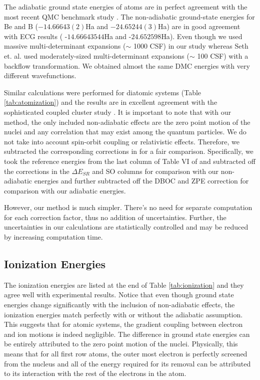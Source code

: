 \documentclass[aps,prl,superscriptaddress,groupedaddress]{revtex4}
\begin{document}
The adiabatic ground state energies of atoms are in perfect agreement with the most recent QMC benchmark study \cite{Seth_Bench}. The non-adiabatic ground-state energies for Be and B ($-14.66643(2)$Ha and $-24.65244(3)$Ha) are in good agreement with ECG results ( -$14.66643544$Ha \cite{Bubin_BeH_noBO} and -$24.652598$Ha\cite{Bubin_BH_noBO}). Even though we used massive multi-determinant expansions ($\sim$ 1000 CSF) in our study whereas Seth et. al. \cite{Seth_Bench} used moderately-sized multi-determinant expansions ($\sim$ 100 CSF) with a backflow transformation. We obtained almost the same DMC energies with very different wavefunctions.

Similar calculations were performed for diatomic systems (Table \ref{tab:atomization}) and the results are in excellent agreement with the sophisticated coupled cluster study \cite{Feller_Corrections}. It is important to note that with our method, the only included non-adiabatic effects are the zero point motion of the nuclei and any correlation that may exist among the quantum particles. We do not take into account spin-orbit coupling or relativistic effects. Therefore, we subtracted the corresponding corrections in \cite{Feller_Corrections} for a fair comparison. Specifically, we took the reference energies from the last column of Table VI of \cite{Feller_Corrections} and subtracted off the corrections in the $\Delta E_{SR}$ and SO columns for comparison with our non-adiabatic energies and further subtracted off the DBOC and ZPE correction for comparison with our adiabatic energies.

However, our method is much simpler. There's no need for separate computation for each correction factor, thus no addition of uncertainties. Further, the uncertainties in our calculations are statistically controlled and may be reduced by increasing computation time. 

\subsection{Ionization Energies}
The ionization energies are listed at the end of Table \ref{tab:ionization} and they agree well with experimental results. Notice that even though ground state energies change significantly with the inclusion of non-adiabatic effects, the ionization energies match perfectly with or without the adiabatic assumption. This suggests that for atomic systems, the gradient coupling between electron and ion motions is indeed negligible. The difference in ground state energies can be entirely attributed to the zero point motion of the nuclei. Physically, this means that for all first row atoms, the outer most electron is perfectly screened from the nucleus and all of the energy required for its removal can be attributed to its interaction with the rest of the electrons in the atom.
\end{document}
